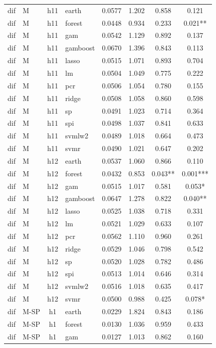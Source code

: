 \begin{ThreePartTable}
\begin{longtable}[t]{llclcccc}
\addlinespace
dif & M & h11 & earth & 0.0577 & 1.202 & 0.858 & 0.121\\
dif & M & h11 & forest & 0.0448 & 0.934 & 0.233 & 0.021**\\
dif & M & h11 & gam & 0.0542 & 1.129 & 0.892 & 0.137\\
dif & M & h11 & gamboost & 0.0670 & 1.396 & 0.843 & 0.113\\
dif & M & h11 & lasso & 0.0515 & 1.071 & 0.893 & 0.704\\
dif & M & h11 & lm & 0.0504 & 1.049 & 0.775 & 0.222\\
dif & M & h11 & pcr & 0.0506 & 1.054 & 0.780 & 0.155\\
dif & M & h11 & ridge & 0.0508 & 1.058 & 0.860 & 0.598\\
dif & M & h11 & sp & 0.0491 & 1.023 & 0.714 & 0.364\\
dif & M & h11 & spi & 0.0498 & 1.037 & 0.841 & 0.633\\
dif & M & h11 & svmlw2 & 0.0489 & 1.018 & 0.664 & 0.473\\
dif & M & h11 & svmr & 0.0490 & 1.021 & 0.647 & 0.202\\
\addlinespace
dif & M & h12 & earth & 0.0537 & 1.060 & 0.866 & 0.110\\
dif & M & h12 & forest & 0.0432 & 0.853 & 0.043** & 0.001***\\
dif & M & h12 & gam & 0.0515 & 1.017 & 0.581 & 0.053*\\
dif & M & h12 & gamboost & 0.0647 & 1.278 & 0.822 & 0.040**\\
dif & M & h12 & lasso & 0.0525 & 1.038 & 0.718 & 0.331\\
dif & M & h12 & lm & 0.0521 & 1.029 & 0.633 & 0.107\\
dif & M & h12 & pcr & 0.0562 & 1.110 & 0.960 & 0.261\\
dif & M & h12 & ridge & 0.0529 & 1.046 & 0.798 & 0.542\\
dif & M & h12 & sp & 0.0520 & 1.028 & 0.782 & 0.486\\
dif & M & h12 & spi & 0.0513 & 1.014 & 0.646 & 0.314\\
dif & M & h12 & svmlw2 & 0.0516 & 1.018 & 0.635 & 0.417\\
dif & M & h12 & svmr & 0.0500 & 0.988 & 0.425 & 0.078*\\
\addlinespace
dif & M-SP & h1 & earth & 0.0229 & 1.824 & 0.843 & 0.186\\
dif & M-SP & h1 & forest & 0.0130 & 1.036 & 0.959 & 0.433\\
dif & M-SP & h1 & gam & 0.0127 & 1.013 & 0.862 & 0.160\\

\end{longtable}
\end{ThreePartTable}

